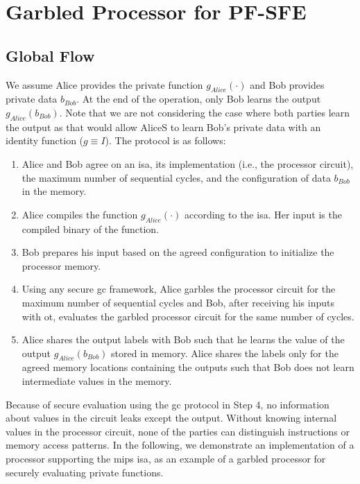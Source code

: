 \section{Garbled Processor for PF-SFE} \label{sec:processor-pro-pfsfe}
\subsection{Global Flow}\label{ssec:processor-mips-flow}
We assume Alice provides the private function $g_{Alice}(\cdot)$ and Bob provides private data $b_{Bob}$.
At the end of the operation, only Bob learns the output $g_{Alice}(b_{Bob})$.
Note that we are not considering the case where both parties learn the output as that would allow AliceS to learn Bob's private data with an identity function ($g\equiv I$).
The protocol is as follows:

\begin{enumerate}
\item
  Alice and Bob agree on an \acrfull{isa}, its implementation (i.e., the processor circuit), the maximum number of sequential cycles, and the configuration of data $b_{Bob}$ in the memory.
\item
  Alice compiles the function $g_{Alice}(\cdot)$ according to the \acrshort{isa}.
  Her input is the compiled binary of the function.
\item
  Bob prepares his input based on the agreed configuration to initialize the processor memory.
\item
  Using any secure \acrshort{gc} framework, Alice garbles the processor circuit for the maximum number of sequential cycles and Bob, after receiving his inputs with \acrfull{ot}, evaluates the garbled processor circuit for the same number of cycles.

\item
  Alice shares the output labels with Bob such that he learns the value of the output $g_{Alice}(b_{Bob})$ stored in memory.
  Alice shares the labels only for the agreed memory locations containing the outputs such that Bob does not learn intermediate values in the memory.
\end{enumerate}

Because of secure evaluation using the \acrshort{gc} protocol in Step 4, no information about values in the circuit leaks except the output.
Without knowing internal values in the processor circuit, none of the parties can distinguish instructions or memory access patterns.
In the following, we demonstrate an implementation of a processor supporting the \gls{mips} \acrshort{isa}, as an example of a garbled processor for securely evaluating private functions.

